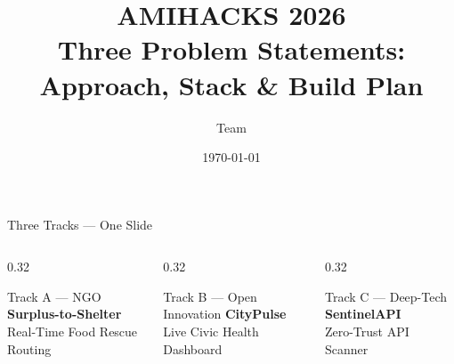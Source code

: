 \documentclass[10pt,aspectratio=169]{beamer}
\title{AMIHACKS 2026\\Three Problem Statements:\\Approach, Stack \& Build Plan}
\author{Team}
\institute{24-Hour Hackathon}
\date{\today}
\begin{document}
\begin{frame}
  \titlepage
\end{frame}

\begin{frame}{Three Tracks — One Slide}
  \begin{columns}[T]
    \begin{column}{0.32\textwidth}
      \begin{block}{Track A — NGO}
        \textbf{Surplus-to-Shelter}\\
        Real-Time Food Rescue Routing
        \vspace{2mm}
      \end{block}
    \end{column}
    \begin{column}{0.32\textwidth}
      \begin{block}{Track B — Open Innovation}
        \textbf{CityPulse}\\
        Live Civic Health Dashboard
        \vspace{2mm}
      \end{block}
    \end{column}
    \begin{column}{0.32\textwidth}
      \begin{block}{Track C — Deep-Tech}
        \textbf{SentinelAPI}\\
        Zero-Trust API Scanner
        \vspace{2mm}
      \end{block}
    \end{column}
  \end{columns}
\end{frame}
\end{document}
